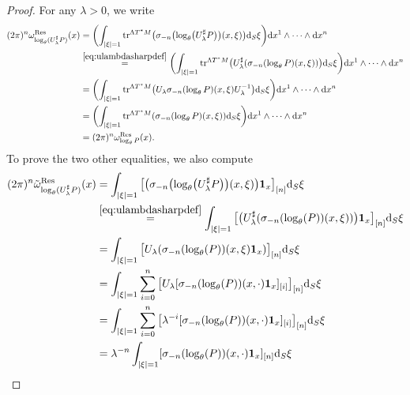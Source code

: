 \documentclass[pdftex]{sigma}
\numberwithin{equation}{section}
\theoremstyle{definition}
\def \bui#1#2{\mathrel{\mathop{\kern 0pt#1}\limits^{#2}}}
\begin{document}
\begin{proof} For any $\lambda>0$, we write
\begin{align*}
 (2\pi)^n\omega_{\log_\theta(U_{ \lambda}^\sharp P)}^{{ {\rm Res}}}(x) &{}= \biggl( \int_{\vert \xi\vert=1} {\rm tr}^{\Lambda T^*M}\bigl(\sigma_{ {-n}}\bigl(\log_\theta\bigl(U_{ \lambda}^\sharp P\bigr)\bigr)(x,\xi)\bigr) {\rm d}_S\xi\biggr) {\rm d}{ x^1}\wedge \dots \wedge {\rm d}{x^n}\\
 &{}\bui{=}{\eqref{eq:ulambdasharpdef}}\biggl( \int_{\vert \xi\vert=1} {\rm tr}^{\Lambda T^*M}\bigl(U_{ \lambda}^\sharp(\sigma_{ {-n}}( \log_\theta P)(x,\xi))\bigr) {\rm d}_S\xi\biggr) {\rm d}{ x^1}\wedge \dots \wedge {\rm d}{x^n}\\
 &{}=\biggl( \int_{\vert \xi\vert=1} {\rm tr}^{\Lambda T^*M}\bigl(U_{ \lambda} \sigma_{ {-n}}( \log_\theta P)(x,\xi)U_\lambda^{-1}\bigr) {\rm d}_S\xi\biggr) {\rm d}{ x^1}\wedge \dots \wedge {\rm d}{x^n}\\
 &{}= \biggl(\int_{\vert \xi\vert=1} {\rm tr}^{\Lambda T^*M}(\sigma_{ {-n}}( \log_\theta P)(x,\xi)) {\rm d}_S\xi\biggr) {\rm d}{ x^1}\wedge \dots \wedge {\rm d}{x^n}\\
 &{}=(2\pi)^n\omega_{ \log_\theta P}^{{ {\rm Res}}}(x).
\end{align*}
To prove the two other equalities, we also compute
\begin{align*}
		(2\pi)^n \tilde \omega^{\rm Res}_{\log_\theta(U_{ \lambda}^\sharp P)}(x) &{}= \int_{\vert \xi\vert=1} \big[ \bigl(\sigma_{ {-n}}\bigl(\log_\theta\bigl(U_{ \lambda}^\sharp P\bigr)\bigr)(x,\xi)\bigr) {\bf 1}_x\big]_{[n]} {\rm d}_S\xi\nonumber\\
 &{}\bui{=}{\eqref{eq:ulambdasharpdef}}\int_{\vert \xi\vert=1} \big[ \bigl(U_\lambda^\sharp (\sigma_{ {-n}}(\log_\theta( P))(x,\xi))\bigr) {\bf 1}_x\big]_{[n]} {\rm d}_S\xi\nonumber\\
 &{}=\int_{\vert \xi\vert=1} \big[U_\lambda (\sigma_{ {-n}}(\log_\theta( P))(x,\xi){\bf 1}_x)\big]_{[n]} {\rm d}_S\xi\nonumber\\
 &{}=\int_{\vert \xi\vert=1}\sum_{i=0}^n \big[U_\lambda [ \sigma_{-n}(\log_\theta( P))(x,\cdot) {\bf 1}_x ]_{[i]}\big]_{[n]} {\rm d}_S\xi\nonumber\\
&{}=\int_{\vert \xi\vert=1} \sum_{i=0}^n \big[\lambda^{-i}[ \sigma_{-n}(\log_\theta( P))(x,\cdot) {\bf 1}_x ]_{[i]}\big]_{[n]} {\rm d}_S\xi\nonumber\\
&{}=\lambda^{-n}\int_{\vert \xi\vert=1} [\sigma_{-n}(\log_\theta( P))(x,\cdot){\bf 1}_x]_{[n]} {\rm d}_S\xi\nonumber\\

\end{align*}
\end{proof}
\end{document}

